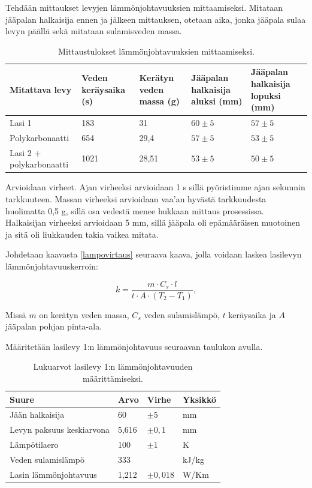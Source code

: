 \documentclass[a4paper,11pt]{article}
\begin{document}
Tehdään mittaukset levyjen lämmönjohtavuuksien mittaamiseksi. Mitataan jääpalan halkaisija ennen ja jälkeen mittauksen, otetaan aika, jonka jääpala sulaa levyn päällä sekä mitataan sulamisveden massa.
\begin{table}[H]
\begin{center}
\caption{Mittaustulokset lämmönjohtavuuksien mittaamiseksi.}
\begin{tabular}{ | p{2.5cm} | p{2.5cm} | p{2.5cm} | p{2.5cm} | p{2.5cm} | }
  \hline 
  Mitattava levy & Veden keräysaika (s) & Kerätyn veden massa (g) & Jääpalan halkaisija aluksi (mm) & Jääpalan halkaisija lopuksi (mm) \\ \hline
  Lasi 1 & 183 & 31 & $60 \pm 5$ & $57 \pm 5$ \\ \hline
  Polykarbonaatti & 654 & 29,4 & $57 \pm 5$ & $53 \pm 5$ \\ \hline
  Lasi 2 + polykarbonaatti & 1021 & 28,51 & $53 \pm 5$ & $50 \pm 5$ \\ \hline
\end{tabular}
\end{center}
\end{table}

Arvioidaan virheet. Ajan virheeksi arvioidaan 1 s sillä pyöristimme ajan sekunnin tarkkuuteen. Massan virheeksi arvioidaan vaa'an hyvästä tarkkuudesta huolimatta 0,5 g, sillä osa vedestä menee hukkaan mittaus prosessissa. Halkaisijan virheeksi arvioidaan 5 mm, sillä jääpala oli epämääräisen muotoinen ja sitä oli liukkauden takia vaikea mitata. 

Johdetaan kaavasta \ref{lampovirtaus} seuraava kaava, jolla voidaan laskea lasilevyn lämmönjohtavuuskerroin: 

\begin{equation}
  k = \frac{m \cdot C_s \cdot l}{t \cdot A \cdot (T_2 - T_1)} ,
\end{equation}

Missä $m$ on kerätyn veden massa, $C_s$ veden sulamislämpö, $t$ keräysaika ja $A$ jääpalan pohjan pinta-ala. 

Määritetään lasilevy 1:n lämmönjohtavuus seuraavan taulukon avulla. 
\begin{table}[H]
\begin{center}
\caption{Lukuarvot lasilevy 1:n lämmönjohtavuuden määrittämiseksi. }
\begin{tabular}{ | p{3cm} | p{3cm} | p{3cm} | p{3cm} | }
  \hline 
  Suure & Arvo & Virhe & Yksikkö \\ \hline
  Jään halkaisija & 60 & $\pm 5$ & mm \\ \hline
  Levyn paksuus keskiarvona & 5,616 & $\pm 0,1$ & mm \\ \hline
  Lämpötilaero & 100 & $\pm 1$ & K \\ \hline
  Veden sulamislämpö & 333 & & kJ/kg \\ \hline
  Lasin lämmönjohtavuus & 1,212 & $\pm 0,018$ & W/Km \\ \hline
\end{tabular}
\end{center}
\end{table}
\end{document}
